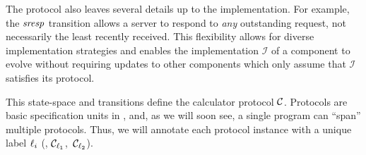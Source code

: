 The protocol also leaves several details up to the implementation.
%
For example, the $\mathit{sresp}$ transition allows a server to respond to
\emph{any} outstanding request, not necessarily the least recently
received.
%
This flexibility allows for diverse implementation strategies and enables
the implementation $\mathcal{I}$ of a component to evolve without requiring updates
to other components which only assume that $\mathcal{I}$ satisfies its protocol.

This state-space and transitions define the calculator protocol
$\mathcal{C}$.
%
Protocols are basic specification units in \disel, and, as we will
soon see, a single program can ``span'' multiple protocols.
%
Thus, we will annotate each protocol instance with a unique label
$\ell_i$ (\eg, $\mathcal{C}_{\ell_1}$,~$\mathcal{C}_{\ell_2}$).


